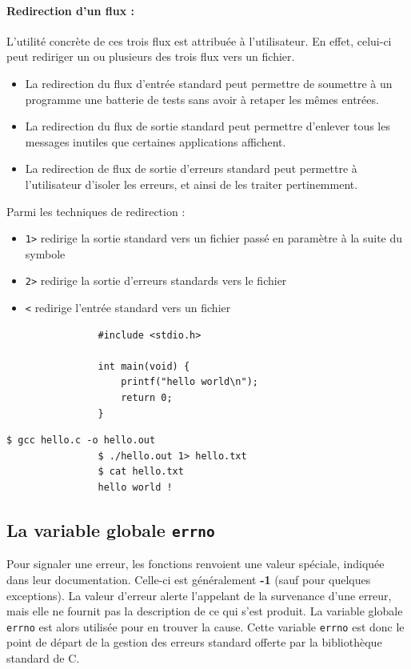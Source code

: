 			\paragraph{Redirection d'un flux :} L'utilité concrète de ces trois flux est attribuée à l'utilisateur. En effet, celui-ci peut rediriger un ou plusieurs des trois flux vers un fichier. 
			\begin{itemize}
				\item La redirection du flux d'entrée standard peut permettre de soumettre à un programme une batterie de tests sans avoir à retaper les mêmes entrées. 
				\item La redirection du flux de sortie standard peut permettre d'enlever tous les messages inutiles que certaines applications affichent.
				\item La redirection de flux de sortie d'erreurs standard peut permettre à l'utilisateur d'isoler les erreurs, et ainsi de les traiter pertinemment.
			\end{itemize}	
			Parmi les techniques de redirection :
			\begin{itemize}
				\item \lstinline!1>! redirige la sortie standard vers un fichier passé en paramètre à la suite du symbole 
				\item \lstinline!2>! redirige la sortie d'erreurs standards vers le fichier
				\item \lstinline!<! redirige l'entrée standard vers un fichier
			\end{itemize}
			
			\begin{lstlisting}
				#include <stdio.h>
				
				int main(void) {
					printf("hello world\n");
					return 0;
				}
			\end{lstlisting}
			
			\begin{lstlisting}[style=terminal]
				$ gcc hello.c -o hello.out
				$ ./hello.out 1> hello.txt
				$ cat hello.txt
				hello world !
			\end{lstlisting}
			
			
	\subsection{La variable globale \lstinline!errno!}
	
		Pour signaler une erreur, les fonctions renvoient une valeur spéciale, indiquée dans leur documentation. Celle-ci est généralement \textbf{-1} (sauf pour quelques exceptions). La valeur d'erreur alerte l'appelant de la survenance d'une erreur, mais elle ne fournit pas la description de ce qui s'est produit. La variable globale \lstinline!errno! est alors utilisée pour en trouver la cause. Cette variable \lstinline!errno! est donc le point de départ de la gestion des erreurs standard offerte par la bibliothèque standard de C. 
		
